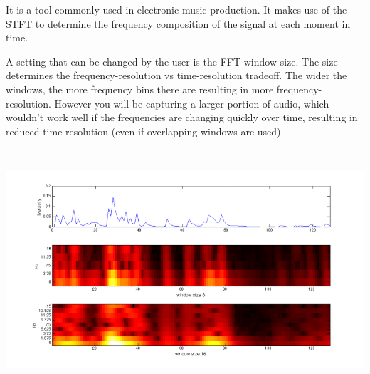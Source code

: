 It is a tool commonly used in electronic music production. 
It makes use of the STFT to determine the frequency composition of the signal
at each moment in time.

A setting that can be changed by the user is the FFT window size.
The size determines the frequency-resolution vs time-resolution tradeoff.
The wider the windows, the more frequency bins there are resulting in more 
frequency-resolution. However you will be capturing a larger portion of audio,
which wouldn't work well if the frequencies are changing quickly over time, resulting in 
reduced time-resolution (even if overlapping windows are used).

\begin{center}\includegraphics[height=9cm]{assets/resolution.png}\end{center}

